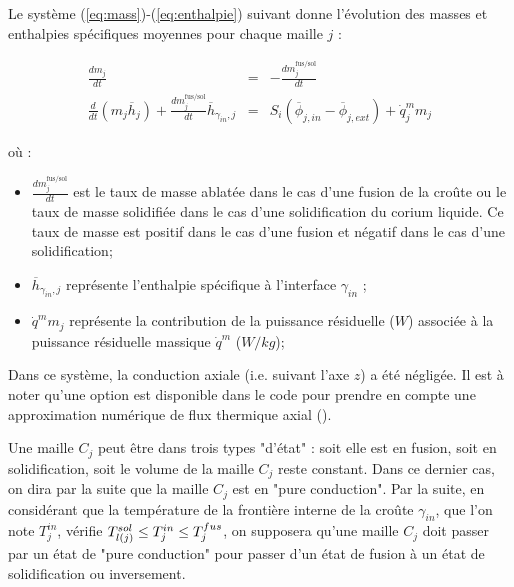 Le système (\ref{eq:mass})-(\ref{eq:enthalpie}) suivant donne l'évolution des masses et enthalpies spécifiques moyennes pour chaque maille $j$ :

\begin{eqnarray}
\frac{dm_{j}}{dt} &=& - \frac{dm_{j}^\text{fus/sol}}{dt} \label{eq:mass} \\ 
 \frac{d}{dt}(m_{j}\overline{h}_{j}) + \frac{dm_{j}^\text{fus/sol}}{dt} \overline{h}_{\gamma_{in},j} & = & S_i\left(\overline{\phi}_{j,in} - \overline{\phi}_{j,ext}\right) + \dot{q}_j^m m_{j} \label{eq:enthalpie}
\end{eqnarray}

où :

\begin{itemize}
 \item $\frac{dm_j^\text{fus/sol}}{dt}$ est le taux de masse ablatée dans le cas d'une fusion de la croûte ou le taux de masse solidifiée dans le cas d'une solidification du corium liquide. Ce taux de masse est positif dans le cas d'une fusion et négatif dans le cas d'une solidification;
 \item $\overline{h}_{\gamma_{in},j}$ représente l'enthalpie spécifique à l’interface $\gamma_{in}$ ;
 \item $\dot{q}^m m_j$ représente la contribution de la puissance résiduelle ($W$) associée à la puissance résiduelle massique $\dot{q}^m$ ($W/kg$);
\end{itemize}
Dans ce système, la conduction axiale (i.e. suivant l'axe $z$) a été négligée. Il est à noter qu'une option est disponible dans le code pour prendre en compte une approximation numérique de flux thermique axial (\cite{Peybernes2018}). 

Une maille $C_j$ peut être dans trois types "d'état" : soit elle est en fusion, soit en solidification, soit le volume de la maille $C_j$ reste constant. Dans ce dernier cas, on dira par la suite que la maille $C_j$ est en "pure conduction". Par la suite, en considérant que la température de la frontière interne de la croûte $\gamma_{in}$, que l'on note $T_j^{in}$, vérifie $\temperature[sol]{l(j)}\leq T_j^{in}\leq T_j^{fus}$, on supposera qu'une maille $C_j$ doit passer par un état de "pure conduction" pour passer d'un état de fusion à un état de solidification ou inversement.

